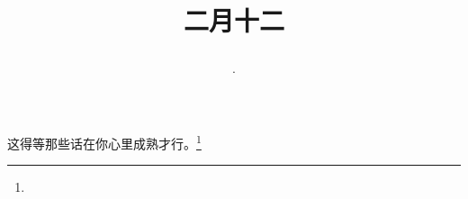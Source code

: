 \title{\date[d=21,m=3,y=2024][year:cn-y,年,month:cn,day:cn,日,·,weekday]·二月十二 }
这得等那些话在你心里成熟才行。\footnote{ }

